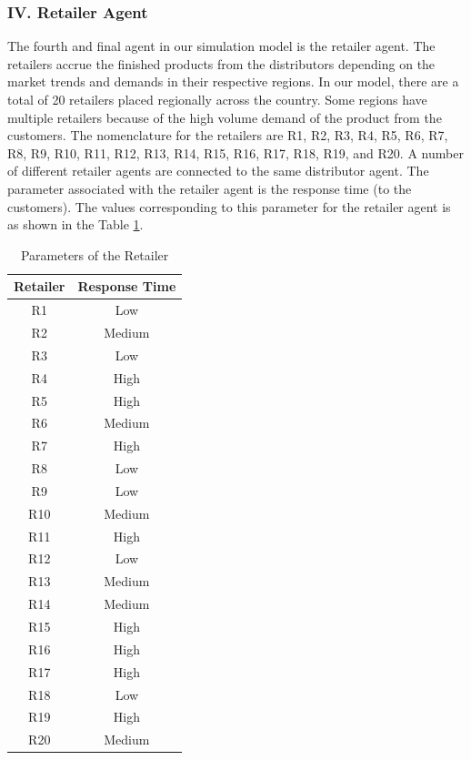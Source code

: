 \subsubsection{IV. Retailer Agent}
The fourth and final agent in our simulation model is the retailer agent. The retailers accrue the finished products from the distributors depending on the market trends and demands in their respective regions. In our model, there are a total of 20 retailers placed regionally across the country. Some regions have multiple retailers because of the high volume demand of the product from the customers. The nomenclature for the retailers are R1, R2, R3, R4, R5, R6, R7, R8, R9, R10, R11, R12, R13, R14, R15, R16, R17, R18, R19, and R20. A number of different retailer agents are connected to the same distributor agent. The parameter associated with the retailer agent is the response time (to the customers). The values corresponding to this parameter for the retailer agent is as shown in the Table \ref{tab:Retailer}.

\begin{table}[H]
\caption{Parameters of the Retailer}
\label{tab:Retailer}
\begin{center}
\begin{tabular}[b]{|c|c|}
	\hline
	Retailer & Response Time \\ \hline
	R1 & Low \\ \hline
	R2 & Medium \\ \hline
	R3 & Low \\ \hline
	R4 & High \\ \hline
	R5 & High \\ \hline
	R6 & Medium \\ \hline
	R7 & High \\ \hline
	R8 & Low \\ \hline
	R9 & Low \\ \hline
	R10 & Medium \\ \hline
	R11 & High \\ \hline
	R12 & Low \\ \hline
	R13 & Medium \\ \hline
	R14 & Medium \\ \hline
	R15 & High \\ \hline
	R16 & High \\ \hline
	R17 & High \\ \hline
	R18 & Low \\ \hline
	R19 & High \\ \hline
	R20 & Medium \\ \hline
\end{tabular}
\end{center}
\end{table}

